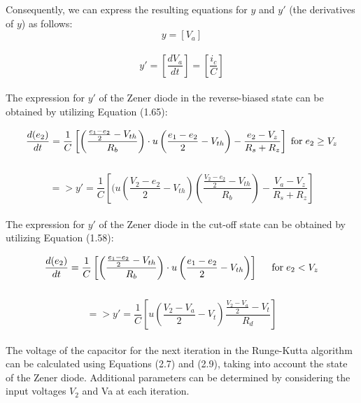 Consequently, we can express the resulting equations for \(y\) and \(y'\) (the derivatives of \(y\)) as follows:\\

\begin{equation}
    y=[V_a]    
\end{equation}\\

\begin{equation}
    y'=[\frac{dV_a}{dt}]=[\frac{i_c}{C}]
\end{equation}\\

The expression for $y'$ of the Zener diode in the reverse-biased state can be obtained by utilizing Equation (1.65):

\begin{equation}
    \frac{d(e_2)}{dt}=\frac{1}{C}\left[\left(\frac{\frac{e_1 - e_2}{2} - V_{th}}{R_b} \right)\cdot u\left(\frac{e_1 - e_2}{2} - V_{th} \right)-\frac{e_2-V_z}{R_s+R_z} \right] \hspace{0.1cm} \text{for} \hspace{0.1cm} e_2 \geq V_z
\end{equation}\\

\begin{equation}
    => y'=\frac{1}{C}[(u(\frac{V_2-e_2}{2}-V_{th})(\frac{\frac{V_2-e_2}{2}-V_{th}}{R_b})-\frac{V_a-V_z}{R_s+R_z}]
\end{equation}\\

The expression for $y'$ of the Zener diode in the cut-off state can be obtained by utilizing Equation (1.58):

\begin{equation}
     \frac{d(e_2)}{dt}=\frac{1}{C} \left[\left(\frac{\frac{e_1 - e_2}{2} - V_{th}}{R_b} \right) \cdot u\left(\frac{e_1-e_2}{2}-V_{th} \right) \right] \hspace{0.5cm} \text{for} \hspace{0.1cm} e_2 < V_z
    \label{eq:de2dt_reverse_bias}
\end{equation}\\

\begin{equation}
    =>y'=\frac{1}{C}[u(\frac{V_2-V_a}{2}-V_t)\frac{\frac{V_2-V_a}{2}-V_t}{R_d}]
\end{equation}\\

The voltage of the capacitor for the next iteration in the Runge-Kutta algorithm can be calculated using Equations (2.7) and (2.9), taking into account the state of the Zener diode. Additional parameters can be determined by considering the input voltages $V_2$ and Va at each iteration.

